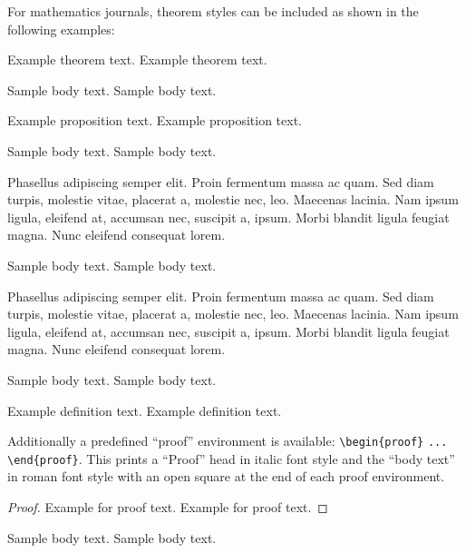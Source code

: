 \documentclass{article}
\begin{document}
For mathematics journals, theorem styles can be included as shown in the following examples:

\begin{theorem}\label{thm1}
Example theorem text. Example theorem text. 
\end{theorem}

Sample body text. Sample body text.

\begin{proposition}
Example proposition text. Example proposition text. 
\end{proposition}

Sample body text. Sample body text. 

\begin{example}
Phasellus adipiscing semper elit. Proin fermentum massa
ac quam. Sed diam turpis, molestie vitae, placerat a, molestie nec, leo. Maecenas lacinia. Nam ipsum ligula, eleifend at, accumsan nec, suscipit a, ipsum. Morbi blandit ligula feugiat magna. Nunc eleifend consequat lorem. 
\end{example}

Sample body text. Sample body text. 

\begin{remark}
Phasellus adipiscing semper elit. Proin fermentum massa
ac quam. Sed diam turpis, molestie vitae, placerat a, molestie nec, leo. Maecenas lacinia. Nam ipsum ligula, eleifend at, accumsan nec, suscipit a, ipsum. Morbi blandit ligula feugiat magna. Nunc eleifend consequat lorem. 
\end{remark}

Sample body text. Sample body text. 

\begin{definition}
Example definition text. Example definition text.
\end{definition}

Additionally a predefined ``proof'' environment is available: \verb+\begin{proof}+ \verb+...+ \verb+\end{proof}+. This prints a ``Proof'' head in italic font style and the ``body text'' in roman font style with an open square at the end of each proof environment. 

\begin{proof}
Example for proof text. Example for proof text. 
\end{proof}

Sample body text. Sample body text. 
\end{document}
